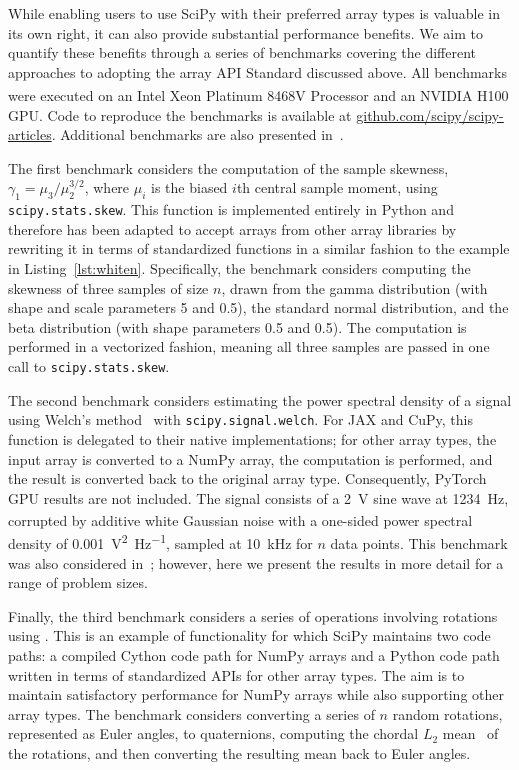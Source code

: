 \documentclass[acmsmall]{acmart}
\begin{document}
While enabling users to use SciPy with their preferred array types is valuable in its
own right, it can also provide substantial performance benefits. We aim to quantify these
benefits through a series of benchmarks covering the different approaches to adopting
the array API Standard discussed above. All benchmarks
were executed on an Intel\textsuperscript{\textregistered}
Xeon\textsuperscript{\textregistered} Platinum 8468V Processor and
an NVIDIA H100 GPU. Code to reproduce the benchmarks is available at
\href{https://github.com/scipy/scipy-articles}{github.com/scipy/scipy-articles}.
Additional benchmarks are also presented in~\cite{Meurer2023,rotation,rbf_bench}.

The first benchmark considers the computation of the sample skewness,
$\gamma_1 = \mu_3/\mu_2^{3/2}$, where $\mu_i$ is the biased $i$th central sample
moment, using \texttt{scipy.stats.skew}. This function is implemented entirely
in Python and therefore has been adapted to accept arrays from other array libraries by
rewriting it in terms of standardized functions in a similar fashion to the example in
Listing~\ref{lst:whiten}. Specifically, the benchmark considers computing the
skewness of three samples of size $n$, drawn from the gamma distribution (with shape
and scale parameters 5 and 0.5), the standard normal distribution, and the beta
distribution (with shape parameters 0.5 and 0.5). The computation is performed in
a vectorized fashion, meaning all three samples are passed in one call to
\texttt{scipy.stats.skew}.

The second benchmark considers estimating the power spectral density of a signal using
Welch's method~\cite{Welch1967} with \texttt{scipy.signal.welch}. For JAX and CuPy, this
function is delegated to their native implementations; for other array types, the input
array is converted to a NumPy array, the computation is performed, and the result is
converted back to the original array type. Consequently, PyTorch GPU results are not
included. The signal consists of a \SI{2}{\volt_{}} sine wave at
\SI{1234}{\hertz}, corrupted by additive white Gaussian noise with a one-sided power
spectral density of \SI{0.001}{\volt\squared\per\hertz}, sampled at \SI{10}{\kilo\hertz}
for $n$ data points. This benchmark was also considered in~\cite{Meurer2023}; however,
here we present the results in more detail for a range of problem sizes.

Finally, the third benchmark considers a series of operations involving rotations using
. This is an example of functionality for which
SciPy maintains two code paths: a compiled Cython code path for NumPy arrays and a
Python code path written in terms of standardized APIs for other array types. The aim is
to maintain satisfactory performance for NumPy arrays while also supporting other array
types. The benchmark considers converting a series of $n$ random rotations, represented
as Euler angles, to quaternions, computing the chordal $L_2$ mean~\cite{Hartley2013} of
the rotations, and then converting the resulting mean back to Euler angles.
\end{document}
